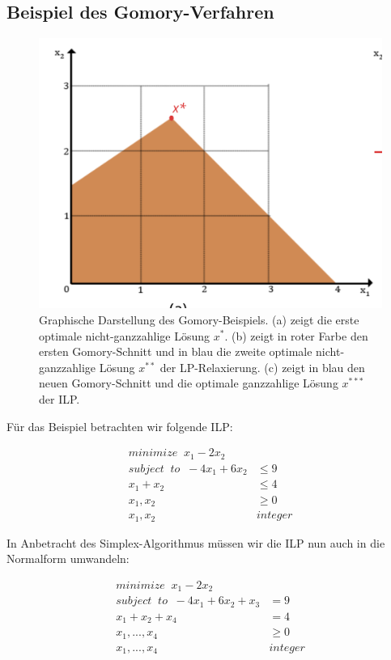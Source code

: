 \documentclass[tog]{acmsiggraph}
\begin{document}
\subsection*{Beispiel des Gomory-Verfahren}

\begin{figure}[t!]
  \centering
  \includegraphics[scale=0.40]{images/gomory-example}
  \caption{Graphische Darstellung des Gomory-Beispiels. (a) zeigt die erste optimale nicht-ganzzahlige Lösung $x^{*}$. (b) zeigt in roter Farbe den ersten Gomory-Schnitt und in blau die zweite optimale nicht-ganzzahlige Lösung $x^{**}$ der LP-Relaxierung. (c) zeigt in blau den neuen Gomory-Schnitt und die optimale ganzzahlige Lösung $x^{***}$ der ILP. }
  \label{fig:gomory-example}
\end{figure}

Für das Beispiel betrachten wir folgende ILP:

\large
\begin{align}
\label{Eq:Gomory-Beispiel-ILP}
minimize \;\; x_1 - 2x_2 & \nonumber \\
subject \;\; to \;\; -4x_1 + 6x_2 &\leq 9 \nonumber \\
x_1 + x_2 &\leq 4 \nonumber \\
x_1, x_2 &\geq 0 \nonumber \\
x_1, x_2 \;\; &integer
\end{align}
\normalsize

In Anbetracht des Simplex-Algorithmus müssen wir die ILP nun auch in die Normalform umwandeln:

\large
\begin{align}
\label{Eq:Gomory-Beispiel-ILP-Normal}
minimize \;\; x_1 - 2x_2 & \nonumber \\
subject \;\; to \;\; -4x_1 + 6x_2 + x_3 &= 9 \nonumber \\
x_1 + x_2 + x_4 &= 4 \nonumber \\
x_1, ..., x_4 &\geq 0 \nonumber \\
x_1, ..., x_4 \;\; &integer
\end{align}
\normalsize
\end{document}
